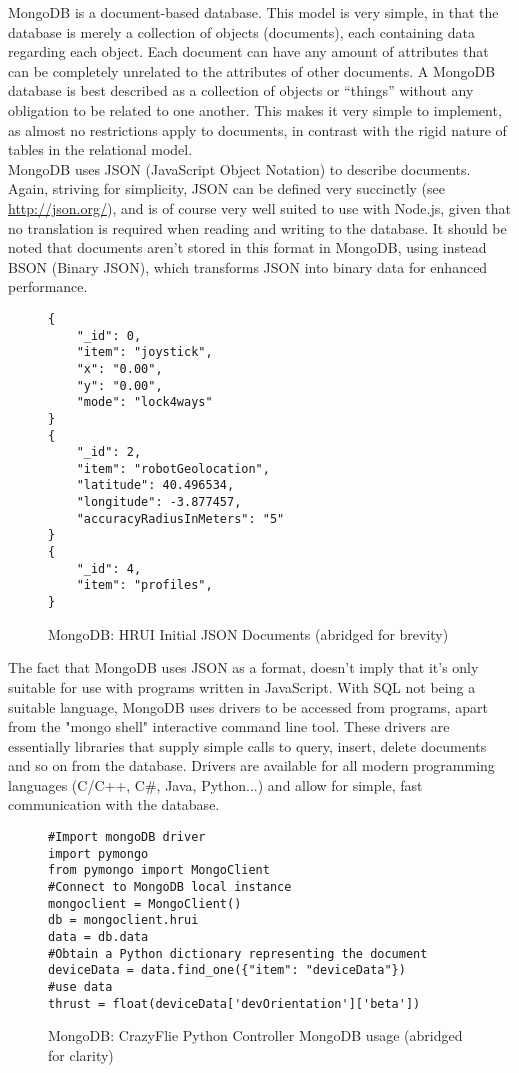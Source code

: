MongoDB is a document-based database. This model is very simple, in that the database is merely a collection of objects (documents),
each containing data regarding each object. Each document can have any amount of attributes that can be completely unrelated to the
attributes of other documents. A MongoDB database is best described as a collection of objects or ``things'' without any obligation to
be related to one another. This makes it very simple to implement, as almost no restrictions apply to documents, in contrast with the
rigid nature of tables in the relational model.\\

MongoDB uses JSON (JavaScript Object Notation) to describe documents. Again, striving for simplicity, JSON can be defined very
succinctly (see \url{http://json.org/}), and is of course very well suited to use with Node.js, given that no translation is required
when reading and writing to the database. It should be noted that documents aren't stored in this format in MongoDB, using instead BSON
(Binary JSON), which transforms JSON into binary data for enhanced performance.
\begin{figure}[H]
\centering
\captionsetup{justification=centering}
\begin{verbatim}
{
    "_id": 0,
    "item": "joystick",
    "x": "0.00",
    "y": "0.00",
    "mode": "lock4ways"
}
{
    "_id": 2,
    "item": "robotGeolocation",
    "latitude": 40.496534,
    "longitude": -3.877457,
    "accuracyRadiusInMeters": "5"
}
{
    "_id": 4,
    "item": "profiles",
}
\end{verbatim}
\caption{MongoDB: HRUI Initial JSON Documents (abridged for brevity)}
\end{figure}
The fact that MongoDB uses JSON as a format, doesn't imply that it's only suitable for use with programs written in JavaScript. With SQL
not being a suitable language, MongoDB uses drivers to be accessed from programs, apart from the "mongo shell" interactive command line
tool. These drivers are essentially libraries that supply simple calls to query, insert, delete documents and so on from the database.
Drivers are available for all modern programming languages (C/C++, C\#, Java, Python...\cite{mongodb11}) and allow for simple, fast
communication with the database.
\begin{figure}[H]
\centering
\captionsetup{justification=centering}
\begin{verbatim}
#Import mongoDB driver
import pymongo
from pymongo import MongoClient
#Connect to MongoDB local instance
mongoclient = MongoClient()
db = mongoclient.hrui
data = db.data
#Obtain a Python dictionary representing the document
deviceData = data.find_one({"item": "deviceData"})
#use data
thrust = float(deviceData['devOrientation']['beta'])
\end{verbatim}
\caption{MongoDB: CrazyFlie Python Controller MongoDB usage (abridged for clarity)}
\end{figure}
